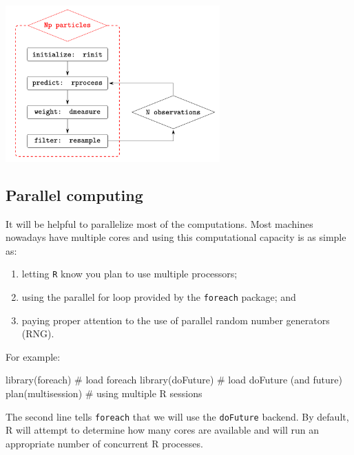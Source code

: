 \documentclass[
  letterpaper,
  DIV=11,
  numbers=noendperiod]{scrartcl}
\newenvironment{Shaded}{\begin{snugshade}}{\end{snugshade}}
\newcommand{\CommentTok}[1]{\textcolor[rgb]{0.37,0.37,0.37}{#1}}
\newcommand{\FunctionTok}[1]{\textcolor[rgb]{0.28,0.35,0.67}{#1}}
\newcommand{\NormalTok}[1]{\textcolor[rgb]{0.00,0.23,0.31}{#1}}
\providecommand{\tightlist}{%
  \setlength{\itemsep}{0pt}\setlength{\parskip}{0pt}}\usepackage{longtable,booktabs,array}
\begin{document}
\begin{center}
    \includegraphics[height=6cm]{../graphics/lec3pf.png}
\end{center}

\hypertarget{parallel-computing}{%
\subsection{Parallel computing}\label{parallel-computing}}

It will be helpful to parallelize most of the computations. Most
machines nowadays have multiple cores and using this computational
capacity is as simple as:

\begin{enumerate}
\def\labelenumi{\arabic{enumi}.}
\tightlist
\item
  letting \texttt{R} know you plan to use multiple processors;
\item
  using the parallel for loop provided by the \texttt{foreach} package;
  and
\item
  paying proper attention to the use of parallel random number
  generators (RNG).
\end{enumerate}

For example:

\begin{Shaded}
\begin{Highlighting}[]
\FunctionTok{library}\NormalTok{(foreach)            }\CommentTok{\# load foreach}
\FunctionTok{library}\NormalTok{(doFuture)           }\CommentTok{\# load doFuture (and future)}
\FunctionTok{plan}\NormalTok{(multisession)          }\CommentTok{\# using multiple R sessions}
\end{Highlighting}
\end{Shaded}

The second line tells \texttt{foreach} that we will use the
\texttt{doFuture} backend. By default, R will attempt to determine how
many cores are available and will run an appropriate number of
concurrent R processes.
\end{document}
